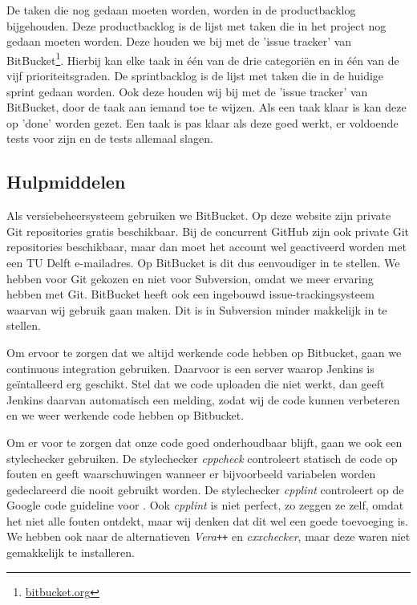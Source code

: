 De taken die nog gedaan moeten worden, worden in de productbacklog bijgehouden. Deze productbacklog is de lijst met taken die in het project nog gedaan moeten worden. Deze houden we bij met de 'issue tracker' van BitBucket\footnote{\href{http://bitbucket.org}{bitbucket.org}}. Hierbij kan elke taak in \'e\'en van de drie categori\"en en in \'e\'en van de vijf prioriteitsgraden. De sprintbacklog is de lijst met taken die in de huidige sprint gedaan worden. Ook deze houden wij bij met de 'issue tracker' van BitBucket, door de taak aan iemand toe te wijzen. Als een taak klaar is kan deze op 'done' worden gezet. Een taak is pas klaar als deze goed werkt, er voldoende tests voor zijn en de tests allemaal slagen.

\subsection{Hulpmiddelen}
Als versiebeheersysteem gebruiken we BitBucket. Op deze website zijn private Git repositories gratis beschikbaar. Bij de concurrent GitHub zijn ook private Git repositories beschikbaar, maar dan moet het account wel geactiveerd worden met een TU Delft e-mailadres. Op BitBucket is dit dus eenvoudiger in te stellen. We hebben voor Git gekozen en niet voor Subversion, omdat we meer ervaring hebben met Git. BitBucket heeft ook een ingebouwd issue-trackingsysteem waarvan wij gebruik gaan maken. Dit is in Subversion minder makkelijk in te stellen.

Om ervoor te zorgen dat we altijd werkende code hebben op Bitbucket, gaan we continuous integration gebruiken. Daarvoor is een server waarop Jenkins is ge\"intalleerd erg geschikt. Stel dat we code uploaden die niet werkt, dan geeft Jenkins daarvan automatisch een melding, zodat wij de code kunnen verbeteren en we weer werkende code hebben op Bitbucket.  

Om er voor te zorgen dat onze code goed onderhoudbaar blijft, gaan we ook een stylechecker gebruiken. De stylechecker \emph{cppcheck} controleert statisch de code op fouten en geeft waarschuwingen wanneer er bijvoorbeeld variabelen worden gedeclareerd die nooit gebruikt worden. De stylechecker \emph{cpplint} controleert op de Google code guideline voor \cpp. Ook \emph{cpplint} is niet perfect, zo zeggen ze zelf, omdat het niet alle fouten ontdekt, maar wij denken dat dit wel een goede toevoeging is. We hebben ook naar de alternatieven \emph{Vera\texttt{++}} en \emph{cxxchecker}, maar deze waren niet gemakkelijk te installeren.
